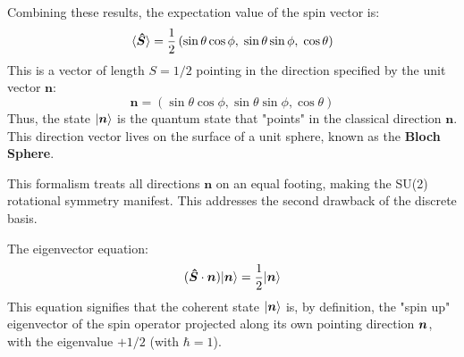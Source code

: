 Combining these results, the expectation value of the spin vector is:
\begin{equation}
    \langle \bm{\hat{S}} \rangle = \frac{1}{2} \left( \sin\theta \cos\phi, \; \sin\theta \sin\phi, \; \cos\theta \right)
\end{equation}
This is a vector of length $S=1/2$ pointing in the direction specified by the unit vector $\bm{n}$:
\begin{equation}
    \bm{n} = (\sin\theta \cos\phi, \sin\theta \sin\phi, \cos\theta)
\end{equation}
Thus, the state $|\bm{n}\rangle$ is the quantum state that "points" in the classical direction $\bm{n}$. This direction vector lives on the surface of a unit sphere, known as the \textbf{Bloch Sphere}.

This formalism treats all directions $\bm{n}$ on an equal footing, making the SU(2) rotational symmetry manifest. This addresses the second drawback of the discrete basis.


The eigenvector equation:
\begin{equation}
    (\bm{\hat{S}} \cdot \bm{n}) |\bm{n}\rangle = \frac{1}{2} |\bm{n}\rangle
\end{equation}
This equation signifies that the coherent state $|\bm{n}\rangle$ is, by definition, the "spin up" eigenvector of the spin operator projected along its own pointing direction $\bm{n}$, with the eigenvalue $+1/2$ (with $\hbar=1$).


